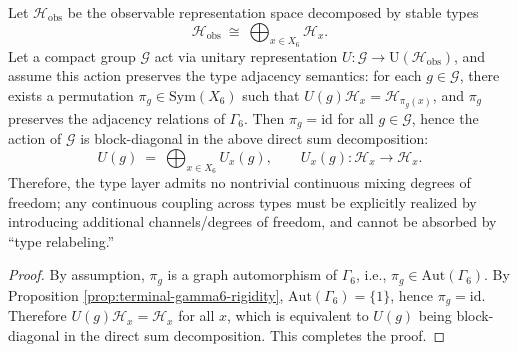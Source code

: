 \begin{corollary}[Superselection decomposition at the type layer: \texorpdfstring{$\mathrm{Aut}(\Gamma_6)=\{1\}$}{Aut(Gamma6)=1} forces continuous symmetries to act only within fibers]\label{cor:window6-type-superselection-autgamma6}
Let \(\mathcal{H}_{\mathrm{obs}}\) be the observable representation space decomposed by stable types
\[
\mathcal{H}_{\mathrm{obs}}\ \cong\ \bigoplus_{x\in X_6}\mathcal{H}_x.
\]
Let a compact group \(\mathcal{G}\) act via unitary representation \(U:\mathcal{G}\to \mathrm{U}(\mathcal{H}_{\mathrm{obs}})\), and assume this action preserves the type adjacency semantics: for each \(g\in\mathcal{G}\), there exists a permutation \(\pi_g\in\mathrm{Sym}(X_6)\) such that
\(
U(g)\mathcal{H}_x=\mathcal{H}_{\pi_g(x)}
\), and \(\pi_g\) preserves the adjacency relations of \(\Gamma_6\).
Then \(\pi_g=\mathrm{id}\) for all \(g\in\mathcal{G}\), hence the action of \(\mathcal{G}\) is block-diagonal in the above direct sum decomposition:
\[
U(g)\ =\ \bigoplus_{x\in X_6}U_x(g),
\qquad
U_x(g):\mathcal{H}_x\to\mathcal{H}_x.
\]
Therefore, the type layer admits no nontrivial continuous mixing degrees of freedom; any continuous coupling across types must be explicitly realized by introducing additional channels/degrees of freedom, and cannot be absorbed by ``type relabeling.''
\end{corollary}
\begin{proof}
By assumption, \(\pi_g\) is a graph automorphism of \(\Gamma_6\), i.e., \(\pi_g\in \mathrm{Aut}(\Gamma_6)\).
By Proposition \ref{prop:terminal-gamma6-rigidity}, \(\mathrm{Aut}(\Gamma_6)=\{1\}\), hence \(\pi_g=\mathrm{id}\).
Therefore \(U(g)\mathcal{H}_x=\mathcal{H}_x\) for all \(x\), which is equivalent to \(U(g)\) being block-diagonal in the direct sum decomposition. This completes the proof.
\end{proof}

